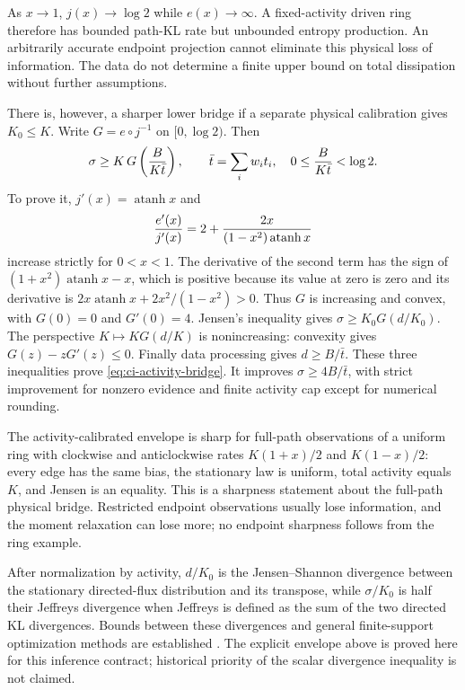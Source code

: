 As $x\to1$, $j(x)\to\log2$ while $e(x)\to\infty$. A fixed-activity driven
ring therefore has bounded path-KL rate but unbounded entropy production.
An arbitrarily accurate endpoint projection cannot eliminate this physical
loss of information. The data do not determine a finite upper bound on total
dissipation without further assumptions.

There is, however, a sharper lower bridge if a separate physical calibration
gives $K_0\le K$. Write $G=e\circ j^{-1}$ on $[0,\log2)$. Then
\begin{equation}
 \sigma\ge K\,G\left({B\over K\bar t}\right),
 \qquad \bar t=\sum_iw_it_i,
 \quad 0\le {B\over K\bar t}<\log2.
 \label{eq:ci-activity-bridge}
\end{equation}
To prove it, $j'(x)=\operatorname{atanh}x$ and
\[
 {e'(x)\over j'(x)}
 =2+{2x\over(1-x^2)\operatorname{atanh}x}
\]
increase strictly for $0<x<1$. The derivative of the second term has the
sign of $(1+x^2)\operatorname{atanh}x-x$, which is positive because its
value at zero is zero and its derivative is
$2x\operatorname{atanh}x+2x^2/(1-x^2)>0$.
Thus $G$ is increasing and convex, with $G(0)=0$ and $G'(0)=4$.
Jensen's inequality gives $\sigma\ge K_0G(d/K_0)$.
The perspective $K\mapsto KG(d/K)$ is nonincreasing: convexity gives
$G(z)-zG'(z)\le0$. Finally data processing gives $d\ge B/\bar t$.
These three inequalities prove \eqref{eq:ci-activity-bridge}.
It improves $\sigma\ge4B/\bar t$, with strict improvement for nonzero
evidence and finite activity cap except for numerical rounding.

The activity-calibrated envelope is sharp for full-path observations of a
uniform ring with clockwise and anticlockwise rates
$K(1+x)/2$ and $K(1-x)/2$: every edge has the same bias, the stationary law is
uniform, total activity equals $K$, and Jensen is an equality. This is a
sharpness statement about the full-path physical bridge. Restricted endpoint
observations usually lose information, and the moment relaxation can lose
more; no endpoint sharpness follows from the ring example.

After normalization by activity, $d/K_0$ is the Jensen--Shannon divergence
between the stationary directed-flux distribution and its transpose, while
$\sigma/K_0$ is half their Jeffreys divergence when Jeffreys is defined as
the sum of the two directed KL divergences. Bounds between these divergences
and general finite-support optimization methods are established
\cite{ciCrooks2008,ciFalasco2022,ciGuntuboyina2014}. The explicit envelope
above is proved here for this inference contract; historical priority of the
scalar divergence inequality is not claimed.

